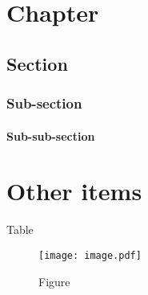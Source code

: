 \chapter{Chapter}
\section{Section}
\subsection{Sub-section}
\subsubsection{Sub-sub-section}

\chapter{Other items}



\begin{table}
  \caption{Table}
  \label{label}
\end{table}

\begin{figure}
  \caption{Figure}
  \texttt{[image: image.pdf]}
\end{figure}

